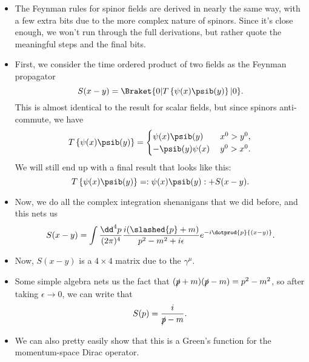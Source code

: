 \begin{itemize}
    \item The Feynman rules for spinor fields are derived in nearly the same way, with a few extra bits due to the more complex nature of spinors. Since it's close enough, we won't run through the full derivations, but rather quote the meaningful steps and the final bits.
    \item First, we consider the time ordered product of two fields as the Feynman propagator
        \begin{equation*}
            S(x-y) = \Braket{0 | T\left\{ \psi(x)\psib(y) \right\} | 0}.
        \end{equation*}
        This is almost identical to the result for scalar fields, but since spinors anti-commute, we have
        \begin{equation*}
            T\left\{ \psi(x)\psib(y) \right\} =
                \begin{alignedat}{1}
                \begin{cases}
                    \psi(x)\psib(y) \quad   &x^0 > y^0, \\
                    -\psib(y)\psi(x)        &y^0 > x^0.
                \end{cases}
                \end{alignedat}
        \end{equation*}
        We will still end up with a final result that looks like this:
        \begin{equation*}
            T\left\{ \psi(x)\psib(y) \right\} = :\psi(x)\psib(y): + S(x-y).
        \end{equation*}
    \item Now, we do all the complex integration shenanigans that we did before, and this nets us
        \begin{equation*}
            S(x-y) = \int \frac{\dd^4p}{(2\pi)^4} \frac{i(\slashed{p} + m)}{p^2-m^2 + i\epsilon}e^{-i\dotprod{p}{(x-y)}}.
        \end{equation*}
    \item Now, $S(x-y)$ is a $4\times4$ matrix due to the $\gamma^{\mu}$.
    \item Some simple algebra nets us the fact that $(\slashed{p}+m)(\slashed{p}-m) = p^2-m^2$, so after taking $\epsilon \rightarrow 0$, we can write that
        \begin{equation*}
            S(p) = \frac{i}{\slashed{p}-m}.
        \end{equation*}
    \item We can also pretty easily show that this is a Green's function for the momentum-space Dirac operator.
\end{itemize}



